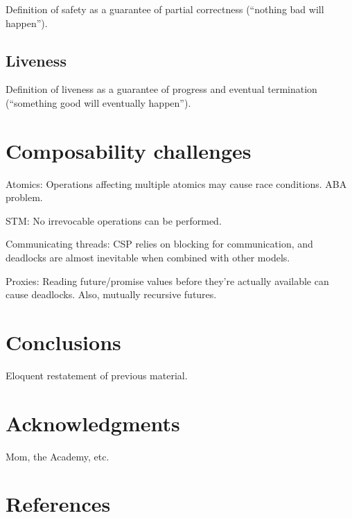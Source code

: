 \documentclass{sig-alternate}
\begin{document}
Definition of safety as a guarantee of partial correctness (``nothing bad will happen'').

\subsection{Liveness}

Definition of liveness as a guarantee of progress and eventual termination (``something good will eventually happen'').

\section{Composability challenges}

Atomics: Operations affecting multiple atomics may cause race conditions. ABA problem.

STM: No irrevocable operations can be performed.

Communicating threads: CSP relies on blocking for communication, and deadlocks are almost inevitable when combined with other models.

Proxies: Reading future/promise values before they're actually available can cause deadlocks. Also, mutually recursive futures.

\section{Conclusions}

Eloquent restatement of previous material.

\section{Acknowledgments}

Mom, the Academy, etc.

\section{References}

\nocite{*}

\printbibliography[heading=none]
\end{document}
